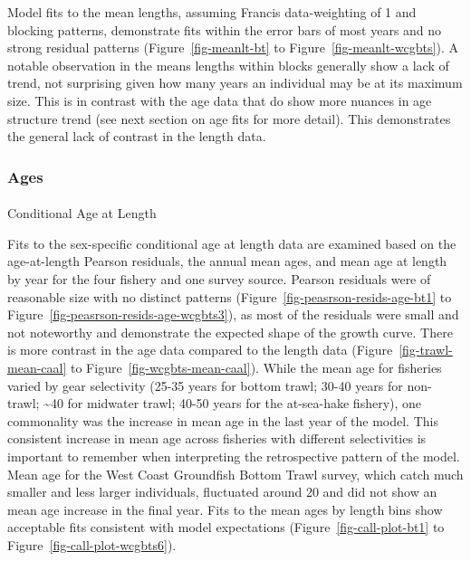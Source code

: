\documentclass[
]{scrartcl}
\makeatletter
\let\oldparagraph\paragraph
\renewcommand{\paragraph}{
    \@ifstar
      \xxxParagraphStar
      \xxxParagraphNoStar
  }
\newcommand{\xxxParagraphStar}[1]{\oldparagraph*{#1}\mbox{}}
\newcommand{\xxxParagraphNoStar}[1]{\oldparagraph{#1}\mbox{}}
\makeatother
\begin{document}
Model fits to the mean lengths, assuming Francis data-weighting of 1 and
blocking patterns, demonstrate fits within the error bars of most years
and no strong residual patterns (Figure~\ref{fig-meanlt-bt} to
Figure~\ref{fig-meanlt-wcgbts}). A notable observation in the means
lengths within blocks generally show a lack of trend, not surprising
given how many years an individual may be at its maximum size. This is
in contrast with the age data that do show more nuances in age structure
trend (see next section on age fits for more detail). This demonstrates
the general lack of contrast in the length data.

\subsubsection{Ages}\label{ages}

\paragraph{Conditional Age at Length}\label{conditional-age-at-length}

Fits to the sex-specific conditional age at length data are examined
based on the age-at-length Pearson residuals, the annual mean ages, and
mean age at length by year for the four fishery and one survey source.
Pearson residuals were of reasonable size with no distinct patterns
(Figure~\ref{fig-peasrson-resids-age-bt1} to
Figure~\ref{fig-peasrson-resids-age-wcgbts3}), as most of the residuals
were small and not noteworthy and demonstrate the expected shape of the
growth curve. There is more contrast in the age data compared to the
length data (Figure~\ref{fig-trawl-mean-caal} to
Figure~\ref{fig-wcgbts-mean-caal}). While the mean age for fisheries
varied by gear selectivity (25-35 years for bottom trawl; 30-40 years
for non-trawl; \textasciitilde40 for midwater trawl; 40-50 years for the
at-sea-hake fishery), one commonality was the increase in mean age in
the last year of the model. This consistent increase in mean age across
fisheries with different selectivities is important to remember when
interpreting the retrospective pattern of the model. Mean age for the
West Coast Groundfish Bottom Trawl survey, which catch much smaller and
less larger individuals, fluctuated around 20 and did not show an mean
age increase in the final year. Fits to the mean ages by length bins
show acceptable fits consistent with model expectations
(Figure~\ref{fig-call-plot-bt1} to Figure~\ref{fig-call-plot-wcgbts6}).
\end{document}
